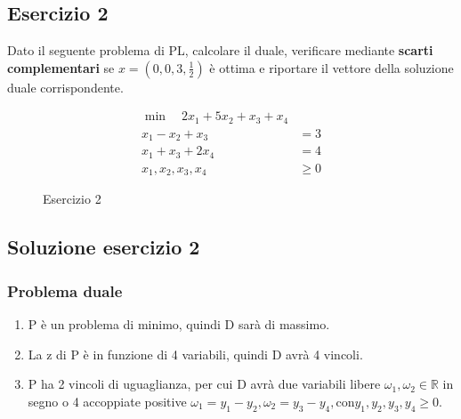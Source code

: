 \documentclass[\main/main.tex]{subfiles}
\begin{document}
\subsection{Esercizio 2}
Dato il seguente problema di PL, calcolare il duale, verificare mediante \textbf{scarti complementari} se $x=(0,0,3,\frac{1}{2})$ è ottima e riportare il vettore della soluzione duale corrispondente.

\begin{figure}
  \begin{align*}
    \min \quad 2x_1 + 5x_2 + x_3 + x_4 \\
    x_1 - x_2 + x_3  & = 3            \\
    x_1 + x_3 + 2x_4 & = 4            \\
    x_1,x_2,x_3,x_4  & \geq 0
  \end{align*}
  \caption{Esercizio 2}
\end{figure}

\subsection{Soluzione esercizio 2}
\subsubsection*{Problema duale}
\begin{enumerate}
  \item P è un problema di minimo, quindi D sarà di massimo.
  \item La z di P è in funzione di 4 variabili, quindi D avrà 4 vincoli.
  \item P ha 2 vincoli di uguaglianza, per cui D avrà due variabili libere $\omega_1, \omega_2 \in \mathbb{R}$ in segno o 4 accoppiate positive $\omega_1 = y_1 - y_2, \omega_2 = y_3 - y_4, \text{con} y_1, y_2, y_3, y_4 \geq 0$.
\end{enumerate}
\end{document}
